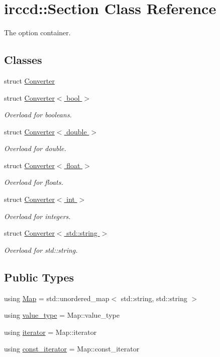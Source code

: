 \hypertarget{a00054}{\section{irccd\-:\-:Section Class Reference}
\label{a00054}
}


The option container.  


\subsection*{Classes}
\begin{DoxyCompactItemize}
\item 
struct \hyperlink{a00017}{Converter}
\item 
struct \hyperlink{a00018}{Converter$<$ bool $>$}
\begin{DoxyCompactList}\small\item\em Overload for booleans. \end{DoxyCompactList}\item 
struct \hyperlink{a00019}{Converter$<$ double $>$}
\begin{DoxyCompactList}\small\item\em Overload for double. \end{DoxyCompactList}\item 
struct \hyperlink{a00020}{Converter$<$ float $>$}
\begin{DoxyCompactList}\small\item\em Overload for floats. \end{DoxyCompactList}\item 
struct \hyperlink{a00021}{Converter$<$ int $>$}
\begin{DoxyCompactList}\small\item\em Overload for integers. \end{DoxyCompactList}\item 
struct \hyperlink{a00022}{Converter$<$ std\-::string $>$}
\begin{DoxyCompactList}\small\item\em Overload for std\-::string. \end{DoxyCompactList}\end{DoxyCompactItemize}
\subsection*{Public Types}
\begin{DoxyCompactItemize}
\item 
using \hyperlink{a00054_a3f77be6ee20c34fda18e7db4c469bd82}{Map} = std\-::unordered\-\_\-map$<$ std\-::string, std\-::string $>$
\item 
using \hyperlink{a00054_a020828c80a755d59714cf700be3e842d}{value\-\_\-type} = Map\-::value\-\_\-type
\item 
using \hyperlink{a00054_a3ae2d0c993b178753a34ccd3970e0e9f}{iterator} = Map\-::iterator
\item 
using \hyperlink{a00054_a3199836dc245a8bd94aeaab5ba11dd1d}{const\-\_\-iterator} = Map\-::const\-\_\-iterator
\end{DoxyCompactItemize}
